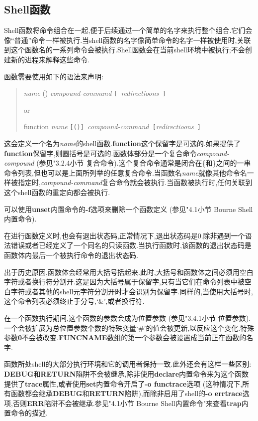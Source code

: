 \documentclass[draft,openany]{book}
\begin{document}
\begin{CJK}{UTF8}{gbsn}
    \section{Shell函数}
    Shell函数将命令组合在一起,便于后续通过一个简单的名字来执行整个组合.它们会像``普通''命令一样被执行.当shell函数的名字像简单命令的名字一样被使用时,关联到这个函数名的一系列命令会被执行.Shell函数会在当前shell环境中被执行;不会创建新的进程来解释这些命令.\par
    函数需要使用如下的语法来声明:
    \begin{quote}
        \emph{name} () \emph{compound-command} \verb+[ +\emph{redirectioons}\verb+ ]+\par
        or\par
        function \emph{name} \verb+[()] +\emph{compound-command}\verb+ [+\emph{redirectioons}\verb+ ]+
    \end{quote}
    这会定义一个名为\emph{name}的shell函数.\textbf{function}这个保留字是可选的.如果提供了\textbf{function}保留字,则圆括号是可选的.函数体部分是一个复合命令\emph{compound-compound} (参见"3.2.4小节 复合命令).这个复合命令通常是闭合在\{和\}之间的一串命令列表,但也可以是上面所列举的任意复合命令.当函数名\emph{name}就像其他命令名一样被指定时,\emph{compound-command}复合命令就会被执行.当函数被执行时,任何关联到这个shell函数的重定向都会被执行.\par
    可以使用\textbf{unset}内置命令的\textbf{-f}选项来删除一个函数定义 (参见"4.1小节 Bourne Shell内置命令).\par
    在进行函数定义时,也会有退出状态码,正常情况下,退出状态码是0.除非遇到一个语法错误或者已经定义了一个同名的只读函数.当执行函数时,该函数的退出状态码是函数体内最后一个被执行命令的退出状态码.\par
    出于历史原因,函数体会经常用大括号括起来.此时,大括号和函数体之间必须用空白字符或者换行符分割开.这是因为大括号属于保留字,只有当它们在命令列表中被空白字符或者其他的shell元字符分割开时才会识别为保留字.同样的,当使用大括号时,这个命令列表必须终止于分号,`\&',或者换行符.\par
    在一个函数执行期间,这个函数的参数会成为位置参数 (参见"3.4.1小节 位置参数).一个会被扩展为总位置参数个数的特殊变量`\#'的值会被更新,以反应这个变化.特殊参数\textbf{0}不会被改变.\textbf{FUNCNAME}数组的第一个参数会被设置成当前正在函数的名字.\par
    函数所处shell的大部分执行环境和它的调用者保持一致.此外还会有这样一些区别: \textbf{DEBUG}和\textbf{RETURN}陷阱不会被继承,除非使用\textbf{declare}内置命令来为这个函数提供了\textbf{trace}属性,或者使用\textbf{set}内置命令开启了\textbf{-o functrace}选项 (这种情况下,所有函数都会继承\textbf{DEBUG}和\textbf{RETURN}陷阱),而除非启用了shell的\textbf{-o errtrace}选项,否则\textbf{ERR}陷阱不会被继承.参见"4.1小节 Bourne Shell内置命令"来查看\textbf{trap}内置命令的描述.\par

\end{CJK}
\end{document}
